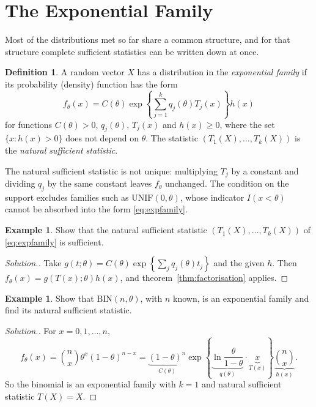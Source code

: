 \documentclass[12pt,a4paper]{report}
\theoremstyle{definition}
\newtheorem{defn}[thm]{Definition}
\newtheorem{exa}[thm]{Example}
\newenvironment{solution}
  {\renewcommand{\qedsymbol}{}\begin{proof}[\textit{Solution}.]}
  {\end{proof}}
\begin{document}
\section{The Exponential Family}

Most of the distributions met so far share a common structure, and for that
structure complete sufficient statistics can be written down at once.

\begin{defn}
\label{def:expfamily}
A random vector $X$ has a distribution in the \emph{exponential family} if its
probability (density) function has the form
\begin{equation}
\label{eq:expfamily}
f_\theta(x) = C(\theta)\exp\left\{\sum^k_{j = 1} q_j(\theta)T_j(x)\right\}h(x)
\end{equation}
for functions $C(\theta)>0$, $q_j(\theta)$, $T_j(x)$ and $h(x)\ge 0$, where the set
$\{x : h(x)>0\}$ does not depend on $\theta$. The statistic
$(T_1(X), \dots, T_k(X))$ is the \emph{natural sufficient statistic}.
\end{defn}

The natural sufficient statistic is not unique: multiplying $T_j$ by a constant
and dividing $q_j$ by the same constant leaves $f_\theta$ unchanged. The condition
on the support excludes families such as $\text{UNIF}(0, \theta)$, whose
indicator $I(x<\theta)$ cannot be absorbed into the form \eqref{eq:expfamily}.

\begin{exa}
\label{ex:expfamilysufficient}
Show that the natural sufficient statistic $(T_1(X), \dots, T_k(X))$ of
\eqref{eq:expfamily} is sufficient.
\end{exa}

\begin{solution}
Take $g(t;\theta) = C(\theta)\exp\left\{\sum_j q_j(\theta)t_j\right\}$ and the given $h$.
Then $f_\theta(x) = g(T(x);\theta)h(x)$, and theorem~\ref{thm:factorisation}
applies.
\end{solution}

\begin{exa}
\label{ex:binomialexpfamily}
Show that $\text{BIN}(n, \theta)$, with $n$ known, is an exponential family and
find its natural sufficient statistic.
\end{exa}

\begin{solution}
For $x = 0, 1, \dots, n$,
\[f_\theta(x) = \binom{n}{x}\theta^x(1 - \theta)^{n - x}
= \underbrace{(1 - \theta)^n}_{C(\theta)}\exp\left\{\underbrace{\ln\frac{\theta}{1 - \theta}}_{q(\theta)}\cdot\underbrace{x}_{T(x)}\right\}\underbrace{\binom{n}{x}}_{h(x)} .\]
So the binomial is an exponential family with $k = 1$ and natural sufficient
statistic $T(X) = X$.
\end{solution}
\end{document}
